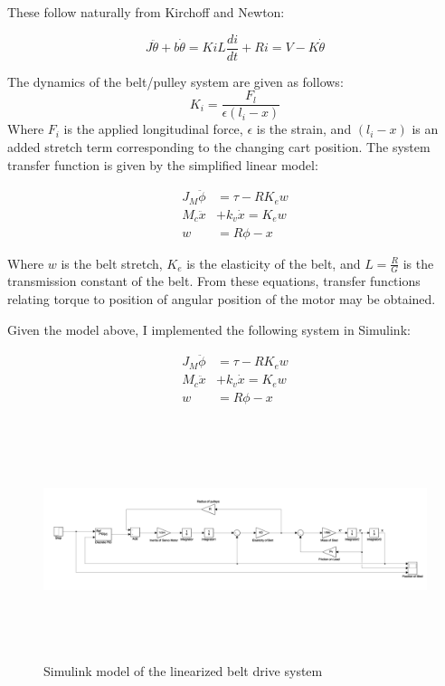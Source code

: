 \documentclass[Nomencl]{SelimArticle}
\begin{document}
These follow naturally from Kirchoff and Newton:

\begin{equation*}
J\ddot{\theta} + b\dot{\theta} = Ki
L\frac{di}{dt} + Ri = V - K\dot{\theta}
\end{equation*}


The dynamics of the belt/pulley system are given as follows:
\begin{equation}
K_i=\frac{F_l}{\epsilon(l_i-x)}
\end{equation}
Where $F_i$ is the applied longitudinal force, $\epsilon$ is the strain, and $(l_i-x)$ is an added stretch term corresponding to the changing cart position.
The system transfer function is given by the simplified linear model:

\begin{align*}
J_M\ddot{\phi} &= \tau - RK_ew \\
M_c\ddot{x}&+k_v\dot{x}=K_ew \\
w&=R\phi - x
\end{align*}

Where $w$ is the belt stretch, $K_e$ is the elasticity of the belt, and $L=\frac{R}{G}$ is the transmission constant of the belt. From these equations, transfer functions relating torque to position of angular position of the motor may be obtained.

Given the model above, I implemented  the following system in Simulink:

\begin{align*}
J_M\ddot{\phi} &= \tau - RK_ew \\
M_c\ddot{x}&+k_v\dot{x}=K_ew \\
w&=R\phi - x
\end{align*}


\begin{figure}[!ht]
    \centering
    \includegraphics[width=\textwidth, height=2.75in]{simulink}
    \caption{Simulink model of the linearized belt drive system}
\end{figure}
\end{document}
